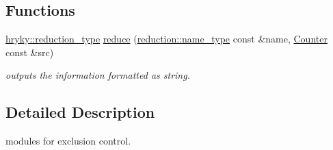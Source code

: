 \subsection*{Functions}
\begin{DoxyCompactItemize}
\item 
\hypertarget{namespacehryky_1_1exclusion_a6368f8766a2da3f808cb0a652ba84e62}{\hyperlink{namespacehryky_a343a9a4c36a586be5c2693156200eadc}{hryky\-::reduction\-\_\-type} \hyperlink{namespacehryky_1_1exclusion_a6368f8766a2da3f808cb0a652ba84e62}{reduce} (\hyperlink{namespacehryky_1_1reduction_ac686c30a4c8d196bbd0f05629a6b921f}{reduction\-::name\-\_\-type} const \&name, \hyperlink{classhryky_1_1exclusion_1_1_counter}{Counter} const \&src)}\label{namespacehryky_1_1exclusion_a6368f8766a2da3f808cb0a652ba84e62}

\begin{DoxyCompactList}\small\item\em outputs the information formatted as string. \end{DoxyCompactList}\end{DoxyCompactItemize}


\subsection{Detailed Description}
modules for exclusion control. 